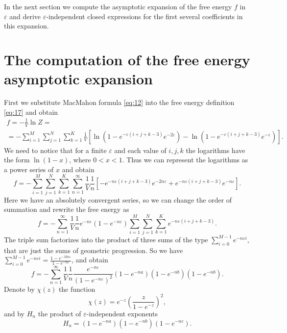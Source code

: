 \documentclass{article}
\begin{document}
In the next section we compute the asymptotic expansion of the free energy $f$ in $\varepsilon$ and
derive $\varepsilon$-independent closed expressions for the first several coefficients in this
expansion.
  
\section{The computation of the free energy asymptotic expansion}
\label{sec:free-energy-scaling}
First we substitute MacMahon formula \eqref{eq:12} into the free energy definition \eqref{eq:17} and
obtain
\begin{multline}
  \label{eq:20}
    f=-\frac{1}{V}\ln Z =\\=- \sum_{i=1}^{M} \sum_{j=1}^{N} \sum_{k=1}^{K} \frac{1}{V}\left[
  \ln\left(1-e^{-\varepsilon (i+j+k-3)} e^{-2\varepsilon}\right) -\ln\left(1-e^{-\varepsilon
      (i+j+k-3)} e^{-\varepsilon}\right)\right].
\end{multline}
We need to notice that for a finite $\varepsilon$ and each value of $i,j,k$ the logarithms have the
form $\ln(1-x)$, where $0<x<1$. Thus we can represent the logarithms as a power series of $x$ and
obtain
\begin{equation}
  \label{eq:7}
  f=-\sum_{i=1}^{M} \sum_{j=1}^{N} \sum_{k=1}^{K}\sum_{n=1}^{\infty}
  \frac{1}{V}\frac{1}{n}\left[-e^{-n\varepsilon (i+j+k-3)} e^{-2n\varepsilon}+e^{-n\varepsilon
      (i+j+k-3)} e^{-n\varepsilon}\right]. 
\end{equation}
Here we have an absolutely convergent series, so we can change the order of summation and rewrite
the free energy as
\begin{equation}
  \label{eq:37}
  f=-\sum_{n=1}^{\infty}
  \frac{1}{V}\frac{1}{n}e^{-n\varepsilon}\left(1-e^{-n\varepsilon}\right)\sum_{i=1}^{M}
  \sum_{j=1}^{N} \sum_{k=1}^{K}e^{-n\varepsilon (i+j+k-3)} .
\end{equation}
The triple sum factorizes into the product of three sums of the type $\sum_{i=0}^{M-1}e^{-n\varepsilon
  i}$, that are just the
 sums of geometric progression. So we have $\sum_{i=0}^{M-1}e^{-n\varepsilon
  i}=\frac{1-e^{-Mn\varepsilon}}{1-e^{-n\varepsilon}}$, and obtain
\begin{equation}
  \label{eq:38}
  f=-\sum_{n=1}^{\infty}
  \frac{1}{V}\frac{1}{n}\frac{e^{-n\varepsilon}}{\left(1-e^{-n\varepsilon}\right)^{2}}
  \left(1-e^{-na}\right)\left(1-e^{-nb}\right)\left(1-e^{-nb}\right).
\end{equation}
Denote by $\chi(z)$ the function
\begin{equation}
  \label{eq:39}
  \chi(z)=e^{-z}\left(\frac{z}{1-e^{-z}}\right)^{2}, 
\end{equation}
and by $H_{n}$ the product of $\varepsilon$-independent exponents
\begin{equation}
  \label{eq:40}
  H_{n}=\left(1-e^{-na}\right)\left(1-e^{-nb}\right)\left(1-e^{-nc}\right).
\end{equation}
\end{document}
